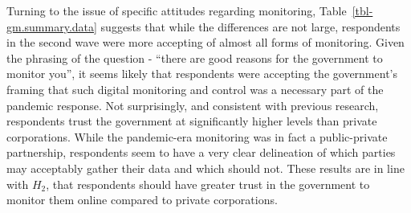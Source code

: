 \documentclass[
  letterpaper,
  DIV=11,
  numbers=noendperiod]{scrartcl}
\begin{document}
\hypertarget{tbl-gp.summary.data}{}
\begin{table}
\caption{\label{tbl-gp.summary.data}Government performance data }\tabularnewline

\centering
{}
\end{table}

Turning to the issue of specific attitudes regarding monitoring,
Table~\ref{tbl-gm.summary.data} suggests that while the differences are
not large, respondents in the second wave were more accepting of almost
all forms of monitoring. Given the phrasing of the question - ``there
are good reasons for the government to monitor you'', it seems likely
that respondents were accepting the government's framing that such
digital monitoring and control was a necessary part of the pandemic
response. Not surprisingly, and consistent with previous research,
respondents trust the government at significantly higher levels than
private corporations. While the pandemic-era monitoring was in fact a
public-private partnership, respondents seem to have a very clear
delineation of which parties may acceptably gather their data and which
should not. These results are in line with \(H_2\), that respondents
should have greater trust in the government to monitor them online
compared to private corporations.
\end{document}
